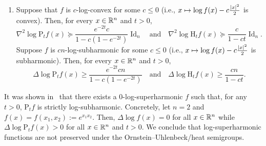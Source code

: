 \documentclass[AHL,Unicode,longabstracts]{cedram}
\newcommand{\R}{\mathbb R}
\DeclareMathOperator{\Id}{Id}
\newcommand{\Pheat}{\mathrm{P}}
\newcommand{\Hheat}{\mathrm{H}}
\newcommand{\dd}{n}
\newcommand{\conv}{c}
\newcommand{\density}{f}
\let\oldmapsto\mapsto
\renewcommand*{\mapsto}{\mathchoice{\longmapsto}{\oldmapsto}{\oldmapsto}{\oldmapsto}}
\let\oldin\in
\renewcommand{\in}{\mathchoice{\oldin}{\oldin}{\,\oldin\,}{\,\oldin\,}}
\begin{document}
\begin{prop}
\begin{enumerate}
\item\label{propA.2.3} Suppose that $\density$ is $\conv$-log-convex for some $\conv\le 0$ (i.e., $x\mapsto \log \density(x)-\conv\frac{|x|^2}{2}$ is convex). Then, for every $x\in \R^{\dd}$ and $t>0$,
\begin{equation}\label{eq:beta_cvx_appendix}
\nabla^2\log\Pheat_t\density(x)\succeq \frac{e^{-2t}\conv}{1-\conv(1-e^{-2t})} \Id_{\dd}\quad\text{and}\quad \nabla^2\log\Hheat_t\density(x) \succeq \frac{\conv}{1-\conv t}\Id_{\dd}.
\end{equation}
Suppose $\density$ is $\conv\dd$-log-subharmonic for some $\conv\le 0$ (i.e., $x\mapsto \log f(x)-\conv\frac{|x|^2}{2}$ is subharmonic). Then, for every $x\in \R^{\dd}$ and $t>0$,
\begin{equation}\label{eq:beta_subharmonic_appendix}
\Delta\log\Pheat_t\density(x)\ge \frac{e^{-2t}\conv\dd}{1-\conv(1-e^{-2t})}\quad\text{and}\quad \Delta \log\Hheat_t\density(x) \ge \frac{\conv\dd}{1-\conv t}.
\end{equation}
\end{enumerate}
\end{prop}
\begin{rema}
It was shown in~\cite[Remark]{MR4632741} that there exists a $0$-log-superharmonic $\density$ such that, for any $t>0$, $\Pheat_t\density$ is strictly log-subharmonic. Concretely, let $\dd=2$ and $\density(x)=\density(x_1,x_2):=e^{x_1x_2}$. Then, $\Delta\log
\density(x)=0$ for all $x\in \R^{\dd}$ while $\Delta\log
\Pheat_t\density(x)>0$ for all $x\in\R^{\dd}$ and $t>0$. We conclude that log-superharmonic functions are not preserved under the Ornstein--Uhlenbeck/heat semigroups.
\end{rema}
\end{document}
